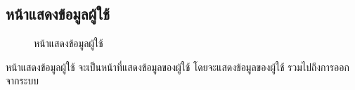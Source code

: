 \documentclass[14pt,oneside,openright,a4paper]{cpe-thai-project}
\begin{document}
\subsection{หน้าแสดงข้อมูลผู้ใช้}
\begin{figure}[!h]\centering
  \setlength{\fboxrule}{0.5mm} %
  \setlength{\fboxsep}{0.5cm}
  \caption{หน้าแสดงข้อมูลผู้ใช้}\label{fig:ui4}
\end{figure}
\hspace*{1cm} หน้าแสดงข้อมูลผู้ใช้ จะเป็นหน้าที่แสดงข้อมูลของผู้ใช้ โดยจะแสดงข้อมูลของผู้ใช้ รวมไปถึงการออกจากระบบ

\newpage
\end{document}
